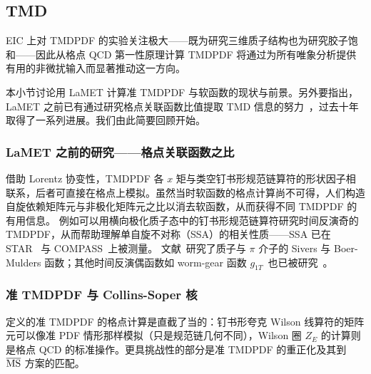 \subsection{TMD}
\label{sec:lattice-TMD}

EIC 上对 TMDPDF 的实验关注极大——既为研究三维质子结构也为研究胶子饱和——因此从格点 QCD 第一性原理计算 TMDPDF 将通过为所有唯象分析提供有用的非微扰输入而显著推动这一方向。

本小节讨论用 LaMET 计算准 TMDPDF 与软函数的现状与前景。另外要指出，LaMET 之前已有通过研究格点关联函数比值提取 TMD 信息的努力~\cite{Hagler:2009mb,Musch:2010ka,Musch:2011er,Engelhardt:2015xja,Yoon:2017qzo}，过去十年取得了一系列进展。我们由此简要回顾开始。

\subsubsection{LaMET 之前的研究——格点关联函数之比}

借助 Lorentz 协变性，TMDPDF 各 $x$ 矩与类空钉书形规范链算符的形状因子相联系，后者可直接在格点上模拟。虽然当时软函数的格点计算尚不可得，人们构造自旋依赖矩阵元与非极化矩阵元之比以消去软函数，从而获得不同 TMDPDF 的有用信息。
例如可以用横向极化质子态中的钉书形规范链算符研究时间反演奇的 TMDPDF，从而帮助理解单自旋不对称（SSA）的相关性质——SSA 已在 STAR~\cite{Adamczyk:2015gyk}
与 COMPASS~\cite{Aghasyan:2017jop}上被测量。
%
文献~\cite{Musch:2011er,Engelhardt:2015xja}研究了质子与 $\pi$ 介子的 Sivers 与 Boer-Mulders 函数；其他时间反演偶函数如 worm-gear 函数 $g_{1T}$~\cite{Tangerman:1994eh}也已被研究~\cite{Yoon:2017qzo}。

\subsubsection{准 TMDPDF 与 Collins-Soper 核}

 定义的准 TMDPDF 的格点计算是直截了当的：钉书形夸克 Wilson 线算符的矩阵元可以像准 PDF 情形那样模拟（只是规范链几何不同），Wilson 圈 $Z_E$ 的计算则是格点 QCD 的标准操作。更具挑战性的部分是准 TMDPDF 的重正化及其到 $\overline{\rm MS}$ 方案的匹配。

